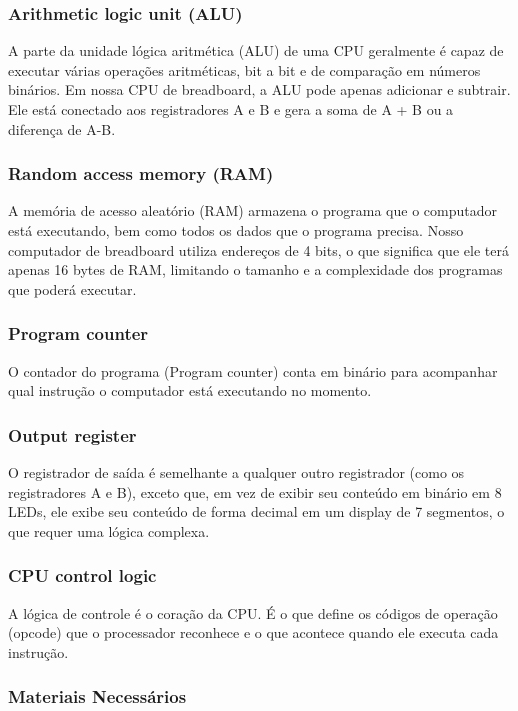 \subsubsection{Arithmetic logic unit (ALU)}
A parte da unidade lógica aritmética (ALU) de uma CPU geralmente é capaz de executar várias operações aritméticas, bit a bit e de comparação em números binários. Em nossa CPU de breadboard, a ALU pode apenas adicionar e subtrair. Ele está conectado aos registradores A e B e gera a soma de A + B ou a diferença de A-B.

\subsubsection{Random access memory (RAM)}
A memória de acesso aleatório (RAM) armazena o programa que o computador está executando, bem como todos os dados que o programa precisa. Nosso computador de breadboard utiliza endereços de 4 bits, o que significa que ele terá apenas 16 bytes de RAM, limitando o tamanho e a complexidade dos programas que poderá executar.

\subsubsection{Program counter}
O contador do programa (Program counter) conta em binário para acompanhar qual instrução o computador está executando no momento.

\subsubsection{Output register}
O registrador de saída é semelhante a qualquer outro registrador (como os registradores A e B), exceto que, em vez de exibir seu conteúdo em binário em 8 LEDs, ele exibe seu conteúdo de forma decimal em um display de 7 segmentos, o que requer uma lógica complexa.

\subsubsection{CPU control logic}
A lógica de controle é o coração da CPU. É o que define os códigos de operação (opcode) que o processador reconhece e o que acontece quando ele executa cada instrução.

\subsubsection{Materiais Necessários}

\newpage